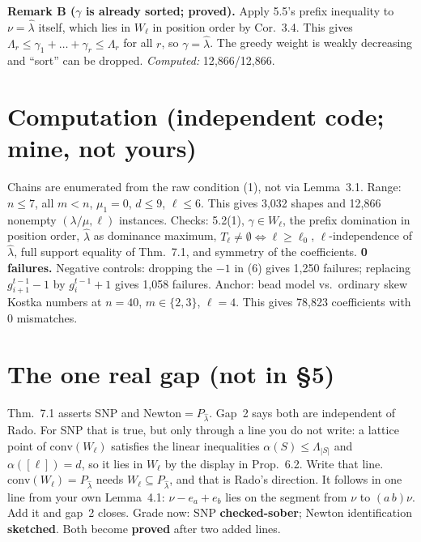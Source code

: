 \documentclass[11pt]{article}
\newcommand{\lh}{\hat\lambda}
\begin{document}
\textbf{Remark B ($\gamma$ is already sorted; proved).} Apply 5.5's prefix inequality to
$\nu=\lh$ itself, which lies in $W_\ell$ in position order by Cor.~3.4. This gives
$\Lambda_r\le\gamma_1+\dots+\gamma_r\le\Lambda_r$ for all $r$, so $\gamma=\lh$. The
greedy weight is weakly decreasing and ``sort'' can be dropped. \emph{Computed:} 12{,}866/12{,}866.

\section{Computation (independent code; mine, not yours)}
Chains are enumerated from the raw condition (1), not via Lemma~3.1. Range: $n\le7$, all $m<n$,
$\mu_1=0$, $d\le9$, $\ell\le6$. This gives 3{,}032 shapes and 12{,}866 nonempty
$(\lambda/\mu,\ell)$ instances. Checks: 5.2(1), $\gamma\in W_\ell$, the prefix
domination in position order, $\lh$ as dominance maximum, $T_\ell\neq\emptyset\iff\ell\ge\ell_0$,
$\ell$-independence of $\lh$, full support equality of Thm.~7.1, and symmetry of the
coefficients. \textbf{0 failures.} Negative controls: dropping the $-1$ in (6) gives
1{,}250 failures; replacing $g^{t-1}_{i+1}-1$ by $g^{t-1}_i+1$ gives 1{,}058 failures.
Anchor: bead model vs.\ ordinary skew Kostka numbers at $n=40$, $m\in\{2,3\}$,
$\ell=4$. This gives 78{,}823 coefficients with 0 mismatches.

\section{The one real gap (not in \S5)}
Thm.~7.1 asserts SNP and $\mathrm{Newton}=P_{\lh}$. Gap~2 says both are independent of
Rado. For SNP that is true, but only through a line you do not write: a lattice point of
$\mathrm{conv}(W_\ell)$ satisfies the linear inequalities $\alpha(S)\le\Lambda_{|S|}$ and
$\alpha([\ell])=d$, so it lies in $W_\ell$ by the display in Prop.~6.2. Write that line.
$\mathrm{conv}(W_\ell)=P_{\lh}$ needs $W_\ell\subseteq P_{\lh}$, and that is Rado's direction.
It follows in one line from your own Lemma~4.1: $\nu-e_a+e_b$ lies on the segment from
$\nu$ to $(a\,b)\nu$. Add it and gap~2 closes. Grade now: SNP \textbf{checked-sober};
Newton identification \textbf{sketched}. Both become \textbf{proved} after two added lines.
\end{document}
